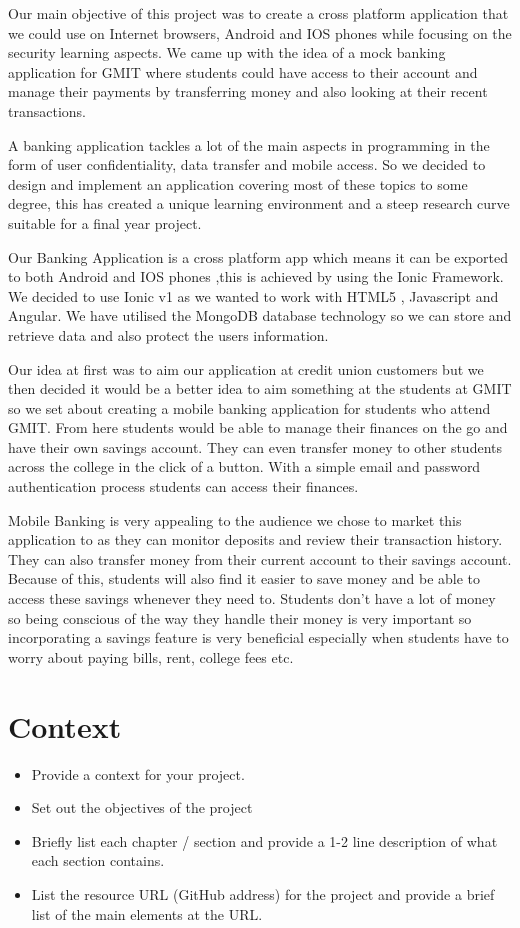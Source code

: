 Our main objective of this project was to create a cross platform application that we could use on Internet browsers, Android and IOS phones while focusing on the security learning aspects. We came up with the idea of a mock banking application for GMIT where students could have access to their account and manage their payments by transferring  money and also looking at their recent transactions.

A banking application tackles a lot of the main aspects in programming in the form of user
confidentiality, data transfer and mobile access. So we decided to design and implement an application covering most of these topics to some degree,  this has created a unique learning environment and a steep research curve suitable for a final year project.

	Our Banking Application is a cross platform app which means it can be exported to both
Android and IOS phones ,this is achieved by using the Ionic Framework. We decided to use Ionic v1 as we wanted to work with HTML5 , Javascript and Angular. We have utilised the  MongoDB database technology so we can store and retrieve data and also protect the users information.

Our idea at first was to aim our application at credit union customers but we then decided it would be a better idea to aim something at the students at GMIT so we set about creating a mobile banking application for students who attend GMIT. From here students would be able to manage their finances on the go and have their own savings account. They can even transfer money to other students across the college in the click of a button. With a simple email and password authentication process students can access their finances.

Mobile Banking is very appealing to the audience we chose to market this application to as they can monitor deposits and review their transaction history. They can also transfer money from their current account to their savings account. Because of this, students will also find it easier to save money and be able to access these savings whenever they need to. Students don’t have a lot of money so being conscious of the way they handle their money is very important so incorporating a savings feature is very beneficial especially when students have to worry about paying bills, rent, college fees etc.




\chapter{Context}
\begin{itemize}
\item Provide a context for your project.
\item Set out the objectives of the project
\item Briefly list each chapter / section and provide a 1-2 line description of what each section contains.
\item List the resource URL (GitHub address) for the project and provide a brief list of the main elements at the URL.

\end{itemize}
